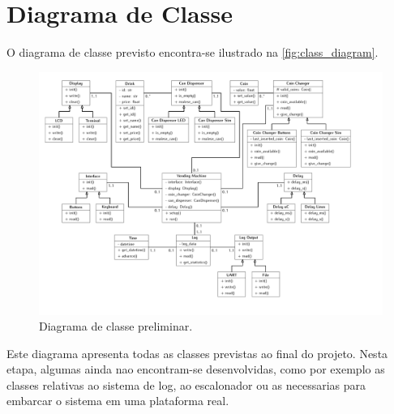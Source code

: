 %
%
%
%
%

%
%
%
%
%

\section{Diagrama de Classe} \label{sec:class_diagrams}

O diagrama de classe previsto encontra-se ilustrado na \autoref{fig:class_diagram}.

\begin{figure}[!ht]
    \begin{center}
        \includegraphics[width=\columnwidth]{figures/class_diagram.pdf}
        \caption{Diagrama de classe preliminar.}
        \label{fig:class_diagram}
    \end{center}
\end{figure}

Este diagrama apresenta todas as classes previstas ao final do projeto. Nesta etapa, algumas ainda nao encontram-se desenvolvidas, como por exemplo as classes relativas ao sistema de log, ao escalonador ou as necessarias para embarcar o sistema em uma plataforma real.
